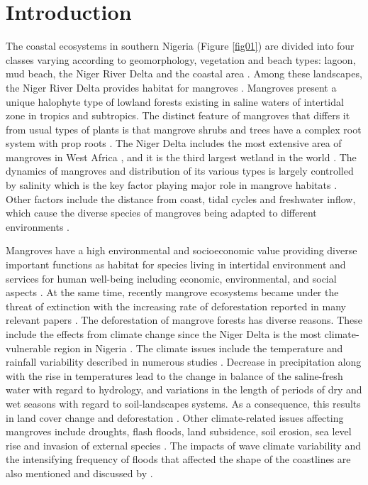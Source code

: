 \documentclass[jmse,article,submit,pdftex,moreauthors]{Definitions/mdpi}
\begin{document}
\section{Introduction}

The coastal ecosystems in southern Nigeria (Figure \ref{fig01}) are divided into four classes varying according to geomorphology, vegetation and beach types: lagoon, mud beach, the Niger River Delta and the coastal area \cite{Ajao}. Among these landscapes, the Niger River Delta provides habitat for mangroves \cite{Ukpong1997}. Mangroves present a unique halophyte type of lowland forests  existing in saline waters of intertidal zone in tropics and subtropics. The distinct feature of mangroves that differs it from usual types of plants is that mangrove shrubs and trees have a complex root system with prop roots \cite{Numbere}. The Niger Delta includes the most extensive area of mangroves in West Africa \cite{KINAKO197735}, and it is the third largest wetland in the world \cite{ZABBEY2021100571}. The dynamics of mangroves and distribution of its various types is largely controlled by salinity which is the key factor playing major role in mangrove habitats \cite{Amadi,Okafor}. Other factors include the distance from coast, tidal cycles and freshwater inflow, which cause the diverse species of mangroves being adapted to different environments \cite{Ukpong1991,Ufuoma}. 

Mangroves have a high environmental and socioeconomic value providing diverse important functions as habitat for species living in intertidal environment \cite{James} and services for human well-being including economic, environmental, and social aspects \cite{AKANNI2018387}. At the same time, recently mangrove ecosystems became under the threat of extinction with the increasing rate of deforestation reported in many relevant papers \cite{Enaruvbe2016,Numbere2021,Osuji,Fasona}. The deforestation of mangrove forests has diverse reasons. These include the effects from climate change since the Niger Delta is the most climate-vulnerable region in Nigeria \cite{BALOGUN2022100304,hydrology7010019}. The climate issues include the temperature and rainfall variability described in numerous studies \cite{Adefolalu,AREOLA2018153,w12020385}. Decrease in precipitation along with the rise in temperatures lead to the change in balance of the saline-fresh water with regard to hydrology, and variations in the length of periods of dry and wet seasons with regard to soil-landscapes systems. As a consequence, this results in land cover change and deforestation \cite{Akintuyi,KHADIJAT2021983}. Other climate-related issues affecting mangroves include droughts, flash floods, land subsidence, soil erosion, sea level rise and invasion of external species \cite{UKPONG199761}. The impacts of wave climate variability and the intensifying frequency of floods that affected the shape of the coastlines are also mentioned and discussed by \cite{DARAMOLA2022102167,OSINOWO2021104471}. 
\end{document}
